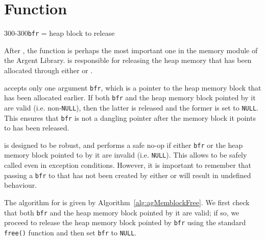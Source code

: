 %
%
\section{Function \agMemblockFree}
  {300-300}{\texttt{bfr} = heap block to release}

After \agMemblockNew{}, the \agMemblockFree{} function is perhaps the most
important one in the memory module of the Argent Library. \agMemblockFree{}
is responsible for releasing the heap memory that has been allocated through 
either \agMemblockNew{} or \agMemblockCopy{}.

\agMemblockFree{} accepts only one argument \texttt{bfr}, which is a pointer to
the heap memory block that has been allocated earlier. If both \texttt{bfr} and
the heap memory block pointed by it are valid (i.e. non-\texttt{\textsc{NULL}}),
then the latter is released and the former is set to \texttt{\textsc{NULL}}.
This ensures that \texttt{bfr} is not a dangling pointer after the memory block
it points to has been released.


\agMemblockFree{} is designed to be robust, and performs a safe no-op if either
\texttt{bfr} or the heap memory block pointed to by it are invalid (i.e.
\texttt{NULL}). This allows \agMemblockFree{} to be safely called even in
exception conditions. However, it is important to remember that passing a
\texttt{bfr} to \agMemblockFree{} that has not been created by either
\agMemblockNew{} or \agMemblockCopy{} will result in undefined behaviour.

The algorithm for \agMemblockFree{} is given by Algorithm\ 
\ref{alg:agMemblockFree}. We first check that both \texttt{bfr} and the heap 
memory block pointed by it are valid; if so, we proceed to release the heap
memory block pointed by \texttt{bfr} using the standard \texttt{free()} function
and then set \texttt{bfr} to \texttt{NULL}.
